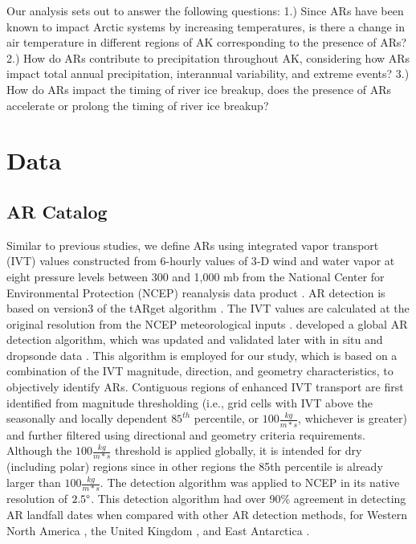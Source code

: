 \documentclass[12pts,draft]{AR_analysis_}
\begin{document}
Our analysis sets out to answer the following questions: 
1.) Since ARs have been known to impact Arctic systems by increasing 
temperatures, is there a change in
air temperature in different regions of AK corresponding to the 
presence of ARs?
2.) How do ARs contribute to precipitation throughout AK, 
considering how ARs impact total annual precipitation, interannual 
variability, and extreme events?
3.) How do ARs impact the timing of river ice breakup, does the presence 
of ARs accelerate or prolong the timing of river ice breakup?

\section{Data}

\subsection{AR Catalog}

Similar to previous studies, we define ARs using integrated vapor
transport (IVT) values constructed from 6-hourly values of 3‐D wind and
water vapor at eight pressure levels between 300 and 1,000
mb from the National Center for Environmental Protection (NCEP) 
reanalysis data product \cite{NCEP_NCAR_reanalysis}. 
AR detection is based on version3 of the tARget algorithm
\cite{Guan_Waliser2019, bin2022}.
The IVT values are calculated at the original
resolution from the NCEP
meteorological inputs \cite{NCEP_reanalysis}.
 developed a global
AR detection algorithm, which was updated and validated later with in
situ and dropsonde data \cite{bin2022}. This algorithm is employed for
our study, which is based on a combination of the IVT magnitude,
direction, and geometry characteristics, to objectively identify ARs.
Contiguous regions of enhanced IVT transport are first identified from
magnitude thresholding (i.e., grid cells with IVT above the seasonally
and locally dependent $85^{th}$ percentile, or $100\frac{kg}{m*s}$, 
whichever is greater) and further filtered
using directional and geometry criteria requirements. Although the 
$100\frac{kg}{m*s}$ threshold is applied globally, it is intended for 
dry (including polar) regions since in other regions the 85th percentile 
is already larger than $100\frac{kg}{m*s}$. The detection
algorithm was applied to NCEP in its native resolution of $2.5 \degree$.
This detection algorithm had over 90\% agreement in detecting AR
landfall dates when compared with other AR detection methods, for Western
North America \cite{Neiman2008}, the United Kingdom \cite{Lavers2011}, 
and East Antarctica \cite{Gorodetskaya2014}. 
\end{document}
